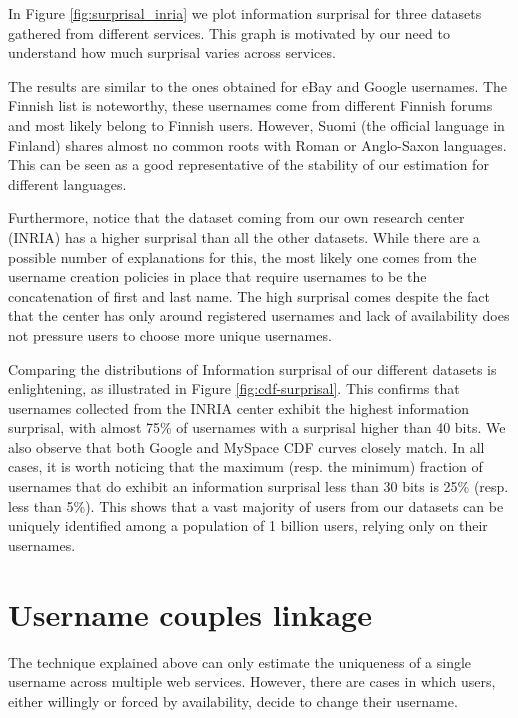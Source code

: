\documentclass[letterpaper]{sig-alternate}
\begin{document}
In Figure \ref{fig:surprisal_inria} we plot information surprisal for three
datasets gathered from different services.
This graph is motivated by our need to understand how much surprisal varies across
services.


The results are similar to the ones obtained for eBay and Google usernames. 
The Finnish list is noteworthy, these usernames come from different Finnish
forums and most likely belong to Finnish users. However, Suomi (the official
language in Finland) shares almost no common roots with Roman or Anglo-Saxon
languages. This can be seen as a good representative
of the stability of our estimation for different
languages.

Furthermore, notice that the dataset coming from our own research center
(INRIA) has a higher surprisal than all the other datasets. While there are a
possible number of explanations for this, the most likely one comes from the
username creation policies in place that require usernames to be the
concatenation of first and last name.  The high surprisal comes despite the
fact that the center has only around  registered usernames and lack
of availability does not pressure users to choose more unique usernames.
 

Comparing the distributions of Information surprisal of our different datasets
is enlightening, as illustrated in Figure \ref{fig:cdf-surprisal}. This
confirms that usernames collected from the INRIA center exhibit the highest
information surprisal, with almost 75\% of usernames with a surprisal higher
than 40 bits. We also observe that both Google and MySpace CDF curves closely
match. In all cases, it is worth noticing that the maximum (resp. the minimum)
fraction of usernames that do exhibit an information surprisal less than 30
bits is 25\% (resp. less than 5\%). This shows that a vast majority of users
from our datasets can be uniquely identified among a population of 1 billion
users, relying only on their usernames.  















\section{Username couples linkage}
\label{couple}

The technique explained above can only estimate the uniqueness of a single
username across multiple web services. However, there are cases in which users,
either willingly or forced by availability, decide to change their username. 
\end{document}

